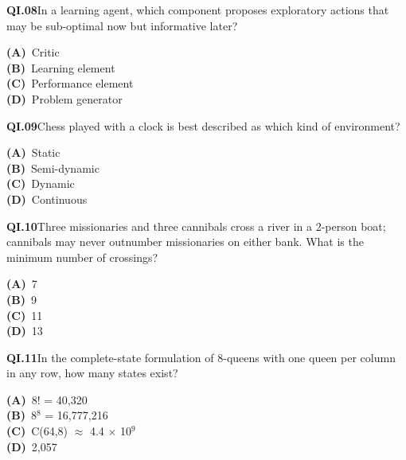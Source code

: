 \begin{tcolorbox}[enhanced,breakable,colback=white,colframe=navyL,arc=2mm,boxrule=0.7pt,left=3mm,right=3mm,top=2mm,bottom=2mm]
\textbf{\color{navy}QI.08}\quad In a learning agent, which component proposes exploratory actions that may be sub-optimal now but informative later?\hfill{}\par\smallskip
{\small \textbf{\color{navyL}(A)}\ Critic\\[1pt]\textbf{\color{navyL}(B)}\ Learning element\\[1pt]\textbf{\color{navyL}(C)}\ Performance element\\[1pt]\textbf{\color{navyL}(D)}\ Problem generator}
\end{tcolorbox}
\begin{tcolorbox}[enhanced,breakable,colback=white,colframe=navyL,arc=2mm,boxrule=0.7pt,left=3mm,right=3mm,top=2mm,bottom=2mm]
\textbf{\color{navy}QI.09}\quad Chess played with a clock is best described as which kind of environment?\hfill{}\par\smallskip
{\small \textbf{\color{navyL}(A)}\ Static\\[1pt]\textbf{\color{navyL}(B)}\ Semi-dynamic\\[1pt]\textbf{\color{navyL}(C)}\ Dynamic\\[1pt]\textbf{\color{navyL}(D)}\ Continuous}
\end{tcolorbox}
\begin{tcolorbox}[enhanced,breakable,colback=white,colframe=navyL,arc=2mm,boxrule=0.7pt,left=3mm,right=3mm,top=2mm,bottom=2mm]
\textbf{\color{navy}QI.10}\quad Three missionaries and three cannibals cross a river in a 2-person boat; cannibals may never outnumber missionaries on either bank. What is the minimum number of crossings?\hfill{}\par\smallskip
{\small \textbf{\color{navyL}(A)}\ 7\\[1pt]\textbf{\color{navyL}(B)}\ 9\\[1pt]\textbf{\color{navyL}(C)}\ 11\\[1pt]\textbf{\color{navyL}(D)}\ 13}
\end{tcolorbox}
\begin{tcolorbox}[enhanced,breakable,colback=white,colframe=navyL,arc=2mm,boxrule=0.7pt,left=3mm,right=3mm,top=2mm,bottom=2mm]
\textbf{\color{navy}QI.11}\quad In the complete-state formulation of 8-queens with one queen per column in any row, how many states exist?\hfill{}\par\smallskip
{\small \textbf{\color{navyL}(A)}\ 8! = 40,320\\[1pt]\textbf{\color{navyL}(B)}\ 8$^8$ = 16,777,216\\[1pt]\textbf{\color{navyL}(C)}\ C(64,8) $\approx$ 4.4 $\times$ 10$^9$\\[1pt]\textbf{\color{navyL}(D)}\ 2,057}
\end{tcolorbox}
